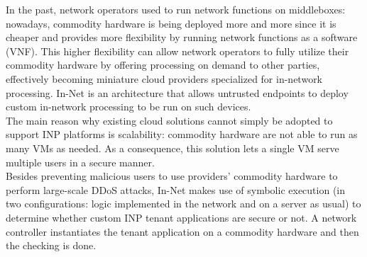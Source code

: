In the past, network operators used to run network functions on middleboxes: nowadays, commodity hardware is being deployed more and more since it is cheaper and provides more flexibility by running network functions as a software (VNF). This higher flexibility can allow network operators to fully utilize their commodity hardware by offering processing on demand to other parties, effectively becoming miniature cloud providers specialized for in-network processing. In-Net \cite{in-net} is an architecture that allows untrusted endpoints to deploy custom in-network processing to be run on such devices.\\
The main reason why existing cloud solutions cannot simply be adopted to support INP platforms is scalability: commodity hardware are not able to run as many VMs as needed. As a consequence, this solution lets a single VM serve multiple users in a secure manner.\\
Besides preventing malicious users to use providers' commodity hardware to perform large-scale DDoS attacks, In-Net \cite{in-net} makes use of symbolic execution (in two configurations: logic implemented in the network and on a server as usual) to determine whether custom INP tenant applications are secure or not. A network controller instantiates the tenant application on a commodity hardware and then the checking is done.